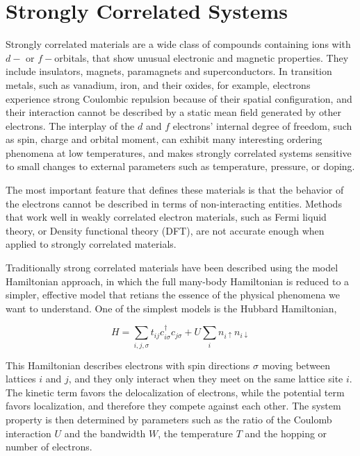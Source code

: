 \section{Strongly Correlated Systems}
Strongly correlated materials are a wide class of compounds containing ions 
with $d-$ or $f-$orbitals, that show unusual electronic and magnetic properties. 
They include insulators, magnets, paramagnets and superconductors. In transition
metals, such as vanadium, iron, and their oxides, for example, electrons experience
strong Coulombic repulsion because of their spatial configuration, and their 
interaction cannot be described by a static mean field generated by other electrons.
The interplay of the $d$ and $f$ electrons' internal degree of freedom, such as
spin, charge and orbital moment, can exhibit many interesting ordering phenomena
at low temperatures, and makes strongly correlated systems sensitive to small
changes to external parameters such as temperature, pressure, or doping. 

The most important feature that defines these materials is that the behavior of the electrons
cannot be described in terms of non-interacting entities. Methods that work well
in weakly correlated electron materials, such as Fermi liquid theory, or Density
functional theory (DFT), are not accurate enough when applied to strongly 
correlated materials. 

Traditionally strong correlated materials have been described using the model Hamiltonian 
approach, in which the full many-body Hamiltonian is reduced to a simpler, effective
model that retians the essence of the physical phenomena we want to understand.
One of the simplest models is the Hubbard Hamiltonian, 

\begin{equation}
  \label{eq:13}
  H=\sum_{i,j,\sigma}t_{ij}c_{i\sigma}^\dagger c_{j\sigma} + U\sum_i n_{i\uparrow} n_{i\downarrow}
\end{equation}

This Hamiltonian describes electrons with spin directions $\sigma$ moving between 
lattices $i$ and $j$, and they only interact when they meet on the same lattice 
site $i$. The kinetic term favors the delocalization of electrons, while the 
potential term favors localization, and therefore they compete against each
other. The system property is then determined by parameters such as the ratio of
the Coulomb interaction $U$ and the bandwidth $W$, the temperature $T$ and the 
hopping or number of electrons. 

